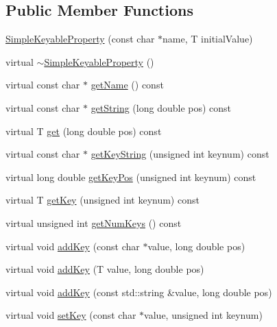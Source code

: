 \subsection*{Public Member Functions}
\begin{DoxyCompactItemize}
\item 
\hyperlink{classmaudio_1_1SimpleKeyableProperty_a02a7f673256949d25c007a20731c248a}{Simple\-Keyable\-Property} (const char $\ast$name, T initial\-Value)
\item 
virtual \hyperlink{classmaudio_1_1SimpleKeyableProperty_ab80ec43285ef052e8922cbd5f6e2550b}{$\sim$\-Simple\-Keyable\-Property} ()
\item 
virtual const char $\ast$ \hyperlink{classmaudio_1_1SimpleKeyableProperty_ad59e0660332de7addc4d30cac06c74d6}{get\-Name} () const 
\item 
virtual const char $\ast$ \hyperlink{classmaudio_1_1SimpleKeyableProperty_ab6fcf9e2072cfeb1d2d325087b56f081}{get\-String} (long double pos) const 
\item 
virtual T \hyperlink{classmaudio_1_1SimpleKeyableProperty_a9f1d5036afe0b46da89a489c73834b91}{get} (long double pos) const 
\item 
virtual const char $\ast$ \hyperlink{classmaudio_1_1SimpleKeyableProperty_a66b1dbdffb78cd64a6ba2372aef51704}{get\-Key\-String} (unsigned int keynum) const 
\item 
virtual long double \hyperlink{classmaudio_1_1SimpleKeyableProperty_a5e7f9b7399708ed4418a97ede30ef39d}{get\-Key\-Pos} (unsigned int keynum) const 
\item 
virtual T \hyperlink{classmaudio_1_1SimpleKeyableProperty_a49b740ce101da9afd7fdaaca907fa684}{get\-Key} (unsigned int keynum) const 
\item 
virtual unsigned int \hyperlink{classmaudio_1_1SimpleKeyableProperty_a7654245fbc63b3c02623884f811e9ea8}{get\-Num\-Keys} () const 
\item 
virtual void \hyperlink{classmaudio_1_1SimpleKeyableProperty_afb3a967f864eeea050cbb3d701c5242c}{add\-Key} (const char $\ast$value, long double pos)
\item 
virtual void \hyperlink{classmaudio_1_1SimpleKeyableProperty_a1c3d5064b77c77489203d0d79f67a2c0}{add\-Key} (T value, long double pos)
\item 
virtual void \hyperlink{classmaudio_1_1SimpleKeyableProperty_a7d1cb59d08f7daf7bd68e42301f12d72}{add\-Key} (const std\-::string \&value, long double pos)
\item 
virtual void \hyperlink{classmaudio_1_1SimpleKeyableProperty_add1b65fb83c28332ed22a879949f1475}{set\-Key} (const char $\ast$value, unsigned int keynum)

\end{DoxyCompactItemize}
